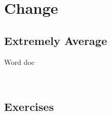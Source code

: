 \section{Change}
\subsection{Extremely Average}
Word doc
\newpage

~\vfill
\subsection{Exercises}
\noindent{}
\newpage
\noindent{}


